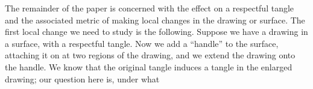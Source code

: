 
The remainder of the paper is concerned with the effect on a respectful tangle and the associated metric of making local changes in the drawing or surface. The first local change we need to study is the following. Suppose we have a drawing in a surface, with a respectful tangle. Now we add a ``handle'' to the surface, attaching it on at two regions of the drawing, and we extend the drawing onto the handle. We know that the original tangle induces a tangle in the enlarged drawing; our question here is, under what

